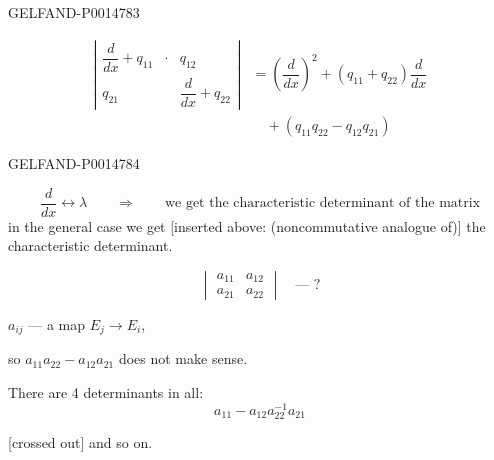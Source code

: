 \begin{GelfandAdjacentEvidence}{GELFAND-P001478}{3}


\begin{equation*}
\begin{aligned}
\left|\begin{array}{ccc}
\dfrac{d}{dx}+q_{11}&\cdot&q_{12}\\
q_{21}&&\dfrac{d}{dx}+q_{22}
\end{array}\right|
 &=\left(\dfrac{d}{dx}\right)^2+(q_{11}+q_{22})\dfrac{d}{dx}\\
 &\quad+(q_{11}q_{22}-q_{12}q_{21})
\end{aligned}
\tag{2}
\end{equation*}
\end{GelfandAdjacentEvidence}
\begin{GelfandAdjacentEvidence}{GELFAND-P001478}{4}


\[
\frac{d}{dx}\longleftrightarrow\lambda
\qquad\Longrightarrow\qquad\text{we get the characteristic determinant of the matrix}
\]
in the general case we get [inserted above: (noncommutative analogue of)]
the characteristic determinant.

\[
\begin{vmatrix}
a_{11}&a_{12}\\a_{21}&a_{22}
\end{vmatrix}
\quad\text{— ?}
\]

\(a_{ij}\) — a map \(E_j\to E_i\),

so \(a_{11}a_{22}-a_{12}a_{21}\) does not make sense.

There are 4 determinants in all:
\begin{equation*}
a_{11}-a_{12}a_{22}^{-1}a_{21}
\tag{3}
\end{equation*}

[crossed out] and so on.
\end{GelfandAdjacentEvidence}



